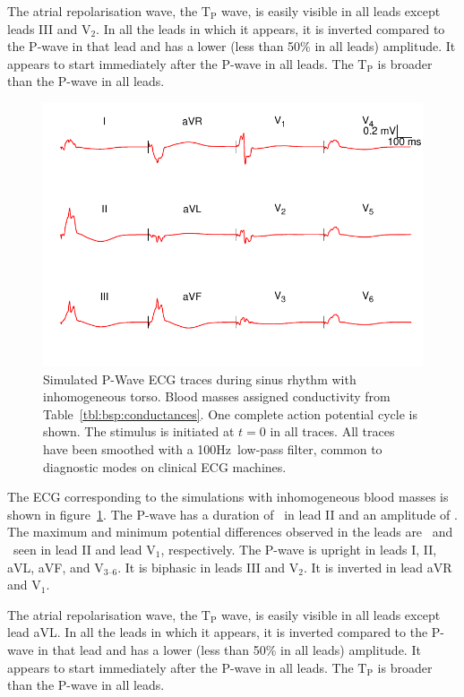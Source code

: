 The atrial repolarisation wave, the $\text{T}_{\text{P}}$ wave, is easily
visible in all leads except leads III and $\text{V}_{\text{2}}$.
In all the leads in which it appears, it is inverted compared to the P-wave in
that lead and has a lower (less than 50\% in all leads) amplitude.
It appears to start immediately after the P-wave in all leads.
The $\text{T}_{\text{P}}$ is broader than the P-wave in all leads.


\begin{figure}
\includegraphics{figures/bsp/ecg_blood}
\caption[12 lead ECG during sinus rhythm, bloodmasses present.]{
\label{bsp:fig:ecg_blood}
Simulated P-Wave ECG traces during sinus rhythm with inhomogeneous torso.
Blood masses assigned conductivity from Table~\ref{tbl:bsp:conductances}.
One complete action potential cycle is shown.
The stimulus is initiated at $t = 0$ in all traces.
All traces have been smoothed with a \unit{100}{Hz}\ low-pass filter, common to
diagnostic modes on clinical ECG machines.
}
\end{figure}

The ECG corresponding to the simulations with inhomogeneous blood masses is shown in
figure~\ref{bsp:fig:ecg_blood}.
The P-wave has a duration of \ in lead II and an amplitude of .
The maximum and minimum potential differences observed in the leads are
\ and \ seen in lead II and lead $\text{V}_{\text{1}}$, respectively.
The P-wave is upright in leads I, II, aVL, aVF, and $\text{V}_{\text{3--6}}$.
It is biphasic in leads III and $\text{V}_{\text{2}}$.
It is inverted in lead aVR and $\text{V}_{\text{1}}$.

The atrial repolarisation wave, the $\text{T}_{\text{P}}$ wave, is easily
visible in all leads except lead aVL.
In all the leads in which it appears, it is inverted compared to the P-wave in
that lead and has a lower (less than 50\% in all leads) amplitude.
It appears to start immediately after the P-wave in all leads.
The $\text{T}_{\text{P}}$ is broader than the P-wave in all leads.

